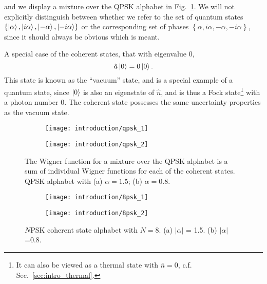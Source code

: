 \noindent and we display a mixture over the QPSK alphabet in Fig.~\ref{fig:qpsk}. We will not explicitly distinguish between whether we refer to the set of quantum states $\left\{\ket{\alpha}, \ket{i \alpha}, \ket{- \alpha}, \ket{- i \alpha}\right\}$ or the corresponding set of phases $\left\{ \alpha, i \alpha, -\alpha, - i\alpha\right\}$, since it should always be obvious which is meant.

A special case of the coherent states, that with eigenvalue $0$,
\begin{equation}
\hat{a} \ket{0} = 0 \ket{0}.
\end{equation}
\noindent This state is known as the ``vacuum'' state, and is a special example of a quantum state, since $\ket{0}$ is also an eigenstate of $\hat{n}$, and is thus a Fock state\footnote{It can also be viewed as a thermal state with $\bar{n}=0$, c.f. Sec.~\ref{sec:intro_thermal}.} with a photon number $0$. The coherent state possesses the same uncertainty properties as the vacuum state.


\begin{figure}[htp]
\captionsetup{width=0.8\linewidth}
\centering
\begin{subfigure}[b]{0.49\linewidth}
\texttt{[image: introduction/qpsk\_1]}
\caption{}
\end{subfigure}
\begin{subfigure}[b]{0.49\linewidth}
\texttt{[image: introduction/qpsk\_2]}
\caption{}
\end{subfigure}
\caption{\label{fig:qpsk} The Wigner function for a mixture over the QPSK alphabet is a sum of individual Wigner functions for each of the coherent states. QPSK alphabet with (a) $\alpha=1.5$; (b) $\alpha=0.8$.}
\end{figure}

\begin{figure}[htp]
\captionsetup{width=0.8\linewidth}
\centering
\begin{subfigure}[b]{0.49\linewidth}
\texttt{[image: introduction/8psk\_1]}
\caption{}
\end{subfigure}
\begin{subfigure}[b]{0.49\linewidth}
\texttt{[image: introduction/8psk\_2]}
\caption{}
\end{subfigure}
\caption{\label{fig:intro_npsk} $N$PSK coherent state alphabet with $N=8$. (a) $\left|\alpha\right|$ = 1.5. (b) $\left|\alpha\right|$=0.8.}
\end{figure}

